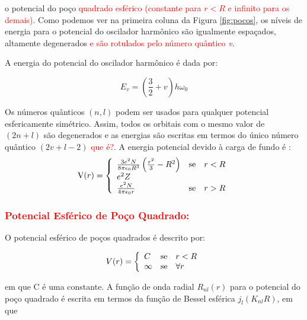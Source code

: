\noindent
o potencial do poço \textcolor{red}{quadrado esférico (constante para $r<R$ e infinito para os demais)}. Como podemos ver na primeira coluna da Figura \ref{fig:pocos}, os níveis de energia para o potencial do oscilador harmônico são igualmente espaçados, altamente degenerados  \textcolor{red}{e são rotulados pelo número quântico \textit{v}}.


A energia do potencial do oscilador harmônico é dada por:

\begin{equation}
    E_{v}= \left(\frac{3}{2}+v\right)h\omega_0
\end{equation}

Os números quânticos $(n,l)$ podem ser usados para qualquer potencial esfericamente simétrico. Assim, todos os orbitais com o mesmo valor de $(2n+l)$ são degenerados e as energias são escritas em termos do único número quântico $(2v+l-2)$ \textcolor{red}{que é?}. A energia potencial devido à carga de fundo é \cite{livro_cap16_Misra2012527}:
\begin{equation}
    \hbox{V}(r)
= \left\{ \begin{array}{lll}
\frac{3e^2N}{8\pi\epsilon_0R^3}\left(\frac{r^2}{3}-R^2\right) & \hbox{se} & r<R \\
e^2 Z & \hbox{} &  \\
\frac{e^2N}{4\pi\epsilon_0r} & \hbox{se} & r > R
\end{array}\right.
\end{equation}

\subsubsection{\textcolor{red}{Potencial Esférico de Poço Quadrado:}}

O potencial esférico de poços quadrados é descrito por:



\begin{equation}
 V(r) = \left\{\begin{array}{lll}
C & \hbox{se} & r < R \\
\infty & \hbox{se}  & \forall r
\end{array}\right.
\end{equation}



\noindent
em que C é uma constante. A função de onda radial $R_{nl}(r)$ para o potencial do poço quadrado é escrita em termos da função de Bessel esférica $j_{l}(K_{nl}R)$, em que

